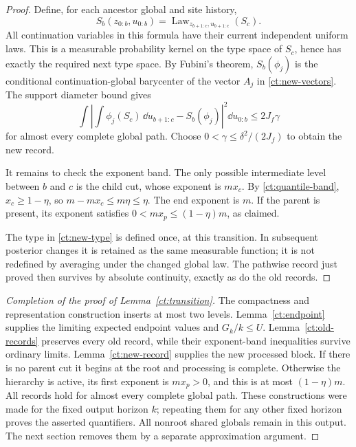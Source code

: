 \begin{proof}
Define, for each ancestor global and site history,
\begin{equation}\label{ct:new-type}
 S_b(z_{0:b},u_{0:b})
       =\operatorname{Law}_{z_{b+1:c},u_{b+1:c}}(S_c).
\end{equation}
All continuation variables in this formula have their current
independent uniform laws.  This is a measurable probability
kernel on the type space of $S_c$, hence has exactly the required
next type space.  By Fubini's theorem,
$S_b(\phi_j)$ is the conditional continuation-global barycenter
of the vector $A_j$ in \eqref{ct:new-vectors}.  The support
diameter bound gives
\[
  \int\left|
           \int\phi_j(S_c)\,\dd u_{b+1:c}-S_b(\phi_j)
      \right|^2\dd u_{0:b}\le 2J_f\gamma
\]
for almost every complete global path.  Choose
$0<\gamma\le\delta^2/(2J_f)$ to obtain the new record.

It remains to check the exponent band.  The only possible
intermediate level between $b$ and $c$ is the child cut, whose
exponent is $mx_c$.  By \eqref{ct:quantile-band},
$x_c\ge1-\eta$, so $m-mx_c\le m\eta\le\eta$.
The end exponent is $m$.  If the parent is present, its exponent
satisfies $0<mx_p\le(1-\eta)m$, as claimed.

The type in \eqref{ct:new-type} is defined once, at this
transition.  In subsequent posterior changes it is retained as
the same measurable function; it is not redefined by averaging
under the changed global law.  The pathwise record just proved
then survives by absolute continuity, exactly as do the old
records.
\end{proof}

\begin{proof}[Completion of the proof of Lemma~\ref{ct:transition}]
The compactness and representation construction inserts at most
two levels.  Lemma~\ref{ct:endpoint} supplies the limiting expected
endpoint values and $G_k/k\le U$.
Lemma~\ref{ct:old-records} preserves every old record, while
their exponent-band inequalities survive ordinary limits.
Lemma~\ref{ct:new-record} supplies the new processed block.
If there is no parent cut it begins at the root and processing
is complete.  Otherwise the hierarchy is active, its first
exponent is $mx_p>0$, and this is at most $(1-\eta)m$.
All records hold for almost every complete global path.  These constructions were made for the fixed output
horizon $k$; repeating them for any other fixed horizon proves
the asserted quantifiers.  All nonroot shared globals remain in this
output.  The next section removes them by a separate approximation
argument.
\end{proof}

